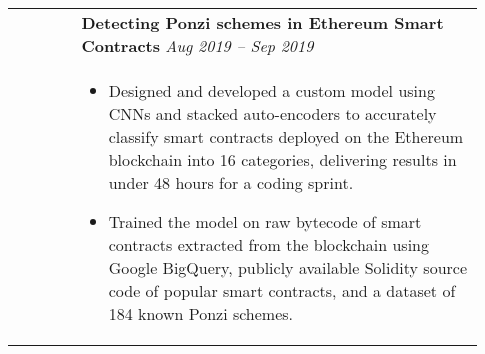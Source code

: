 \documentclass[letterpaper, 10pt, oneside]{article}
\newcommand{\bdit}[1]{{\textbf{#1}}}
\begin{document}
\begin{longtable}{@{} p{0.13\linewidth} p{0.8\linewidth}}

                                                      & \bdit{Detecting Ponzi schemes in Ethereum Smart Contracts} \hfill \textsl{Aug 2019 -- Sep 2019}                                                                                                     \\
                                                      & \parbox{0.8\textwidth}{                                                                                                                                                                               %
        \begin{itemize}[leftmargin=*, itemsep=-0.88ex, topsep=0.2ex]
            \item Designed and developed a custom model using CNNs and stacked auto-encoders to accurately classify smart contracts deployed on the Ethereum blockchain into 16 categories, delivering results in under 48 hours for a coding sprint.
            \item Trained the model on raw bytecode of smart contracts extracted from the blockchain using Google BigQuery, publicly available Solidity source code of popular smart contracts, and a dataset of 184 known Ponzi schemes.
        \end{itemize}
    }                                                                                                                                                                                                                                                         
    \\
    \\[-1ex]


\end{longtable}
\end{document}
